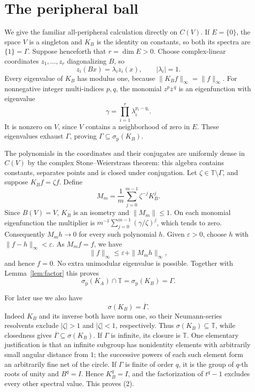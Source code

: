 \documentclass[11pt]{article}
\newcommand{\T}{\mathbb T}
\newcommand{\spoint}{\sigma_{\mathrm p}}
\begin{document}
\section{The peripheral ball}

We give the familiar all-peripheral calculation directly on \(C(V)\).
If \(E=\{0\}\), the space \(V\) is a singleton and \(K_B\) is the identity
on constants, so both its spectra are \(\{1\}=\Gamma\).
Suppose henceforth that \(r=\dim E>0\). Choose complex-linear coordinates
\(z_1,\ldots,z_r\) diagonalizing \(B\), so
\[
 z_i(Bx)=\lambda_i z_i(x),\qquad |\lambda_i|=1.
\]
Every eigenvalue of \(K_B\) has modulus one, because
\(\|K_Bf\|_\infty=\|f\|_\infty\).
For nonnegative integer multi-indices \(p,q\), the monomial
\(z^p\overline z^{\,q}\) is an eigenfunction with eigenvalue
\[
 \gamma=\prod_{i=1}^r\lambda_i^{p_i-q_i}.
\]
It is nonzero on \(V\), since \(V\) contains a neighborhood of zero in
\(E\). These eigenvalues exhaust \(\Gamma\), proving
\(\Gamma\subseteq\spoint(K_B)\).

The polynomials in the coordinates and their conjugates are uniformly
dense in \(C(V)\) by the complex Stone--Weierstrass theorem: this algebra
contains constants, separates points and is closed under conjugation.
Let \(\zeta\in\T\setminus\Gamma\), and suppose \(K_Bf=\zeta f\).
Define
\[
 M_m=\frac1m\sum_{j=0}^{m-1}\zeta^{-j}K_B^j .
\]
Since \(B(V)=V\), \(K_B\) is an isometry and \(\|M_m\|\leq1\).
On each monomial eigenfunction the multiplier is
\(m^{-1}\sum_{j=0}^{m-1}(\gamma/\zeta)^j\), which tends to zero.
Consequently \(M_m h\to0\) for every such polynomial \(h\).
Given \(\varepsilon>0\), choose \(h\) with \(\|f-h\|_\infty<\varepsilon\).
As \(M_m f=f\), we have
\[
 \|f\|_\infty\leq\varepsilon+\|M_m h\|_\infty,
\]
and hence \(f=0\). No extra unimodular eigenvalue is possible.
Together with Lemma~\ref{lem:factor} this proves
\[
 \spoint(K_A)\cap\T=\spoint(K_B)=\Gamma.
 \tag{1}\label{eq:peripheral}
\]

For later use we also have
\[
 \sigma(K_B)=\overline\Gamma.
 \tag{2}\label{eq:peripheral-full}
\]
Indeed \(K_B\) and its inverse both have norm one, so their Neumann-series
resolvents exclude \(|\zeta|>1\) and \(|\zeta|<1\), respectively.
Thus \(\sigma(K_B)\subseteq\T\), while closedness gives
\(\overline\Gamma\subseteq\sigma(K_B)\).
If \(\Gamma\) is infinite, its closure is \(\T\). One elementary
justification is that an infinite subgroup has nonidentity elements with
arbitrarily small angular distance from \(1\); the successive powers of
each such element form an arbitrarily fine net of the circle.
If \(\Gamma\) is finite of order \(q\), it is the group of \(q\)-th roots
of unity and \(B^q=I\). Hence \(K_B^q=I\), and the factorization of
\(t^q-1\) excludes every other spectral value. This proves (2).
\end{document}
